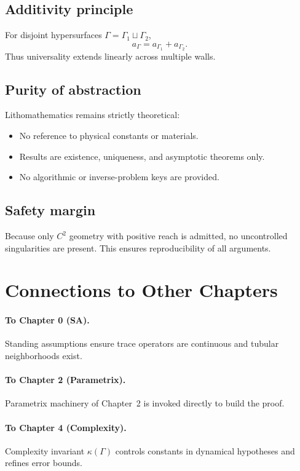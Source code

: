 \subsection{Additivity principle}
For disjoint hypersurfaces $\Gamma=\Gamma_1\sqcup\Gamma_2$,
\[
a_\Gamma=a_{\Gamma_1}+a_{\Gamma_2}.
\]
Thus universality extends linearly across multiple walls.

\subsection{Purity of abstraction}
Lithomathematics remains strictly theoretical:
\begin{itemize}
  \item No reference to physical constants or materials.
  \item Results are existence, uniqueness, and asymptotic theorems only.
  \item No algorithmic or inverse-problem keys are provided.
\end{itemize}

\subsection{Safety margin}
Because only $C^2$ geometry with positive reach is admitted, no uncontrolled singularities are present. This ensures reproducibility of all arguments.

\section{Connections to Other Chapters}
\label{sec:connections}

\paragraph{To Chapter 0 (SA).}
Standing assumptions ensure trace operators are continuous and tubular neighborhoods exist.

\paragraph{To Chapter 2 (Parametrix).}
Parametrix machinery of Chapter~2 is invoked directly to build the proof.

\paragraph{To Chapter 4 (Complexity).}
Complexity invariant $\kappa(\Gamma)$ controls constants in dynamical hypotheses and refines error bounds.

